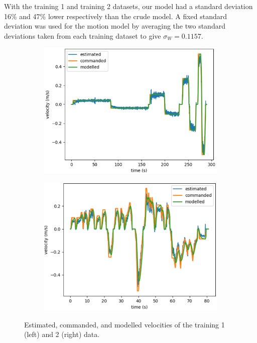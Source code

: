 \documentclass[a4paper,12pt]{article}
\begin{document}
With the training 1 and training 2 datasets, our model had a standard deviation 16\% and 47\% lower respectively than the crude model. A fixed standard deviation was used for the motion model by averaging the two standard deviations taken from each training dataset to give $\sigma_{W}=0.1157$.

\begin{figure}[h]
\centering
\begin{subfigure}{.5\textwidth}
  \centering
  \includegraphics[width=0.9\linewidth]{training1}
\end{subfigure}%
\begin{subfigure}{.5\textwidth}
  \centering
  \includegraphics[width=0.9\linewidth]{training2}
\end{subfigure}
\caption{Estimated, commanded, and modelled velocities of the training 1 (left) and 2 (right) data.}
\end{figure}
\end{document}

